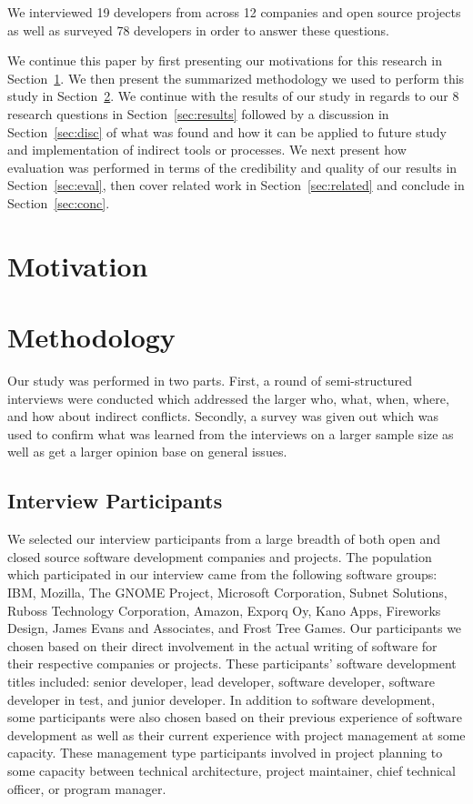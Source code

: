 \documentclass[conference]{IEEEtran}
\begin{document}
We interviewed 19 developers from across 12 companies and open source projects as well as surveyed 78 
developers in order to answer these questions. 


We continue this paper by first presenting our motivations for this research in Section~\ref{sec:mot}.
We then present the summarized methodology we used to perform this study in Section~\ref{sec:meth}. We
continue with the results of our study in regards to our 8 research questions in Section~\ref{sec:results} 
followed by a discussion in Section~\ref{sec:disc} of what was found and how it can be applied to future study and implementation
of indirect tools or processes. We next present how evaluation was performed in terms of the credibility
and quality of our results in Section~\ref{sec:eval}, then cover related work in Section~\ref{sec:related}
and conclude in Section~\ref{sec:conc}.

\section{Motivation}
\label{sec:mot}

\section{Methodology}
\label{sec:meth}

Our study was performed in two parts. First, a round of semi-structured interviews were conducted which 
addressed the larger who, what, when, where, and how about indirect conflicts. Secondly, a survey was given
out which was used to confirm what was learned from the interviews on a larger sample size as well as get
a larger opinion base on general issues.

\subsection{Interview Participants}

We selected our interview participants from a large breadth of both open and closed source software development companies
and projects. The population which participated in our interview came from the following software groups: 
IBM, Mozilla, The GNOME Project, Microsoft Corporation, Subnet Solutions, Ruboss Technology Corporation, 
Amazon, Exporq Oy, Kano Apps, Fireworks Design, James Evans and Associates, and Frost Tree Games. 
Our participants we chosen based on their direct involvement in the actual writing of software for
their respective companies or projects. These participants' software development titles included: senior developer,
lead developer, software developer, software developer in test, and junior developer.
In addition to software development, some participants were also chosen based on their previous experience
of software development as well as their current experience with project management at some capacity. These management
type participants involved in project planning to some capacity between technical architecture, project maintainer,  
chief technical officer, or program manager.
\end{document}
